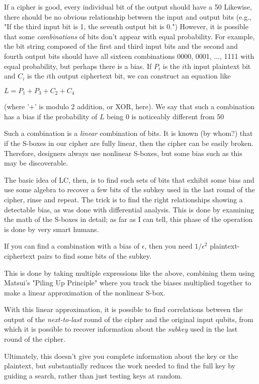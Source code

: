 \documentclass[%
 aip,
 jmp,%
 amsmath,amssymb,
 reprint,%
]{revtex4-1}
\begin{document}
If a cipher is good, every individual bit of the output should have a
50%
Likewise, there should be no obvious relationship between the input
and output bits (e.g., "If the third input bit is 1, the seventh
output bit is 0.")  However, it is possible that some \emph{combinations}
of bits don't appear with equal probability. For example, the bit
string composed of the first and third input bits and the second and
fourth output bits should have all sixteen combinations 0000, 0001,
..., 1111 with equal probability, but perhaps there is a bias.  If $P_i$
is the $i$th input plaintext bit and $C_i$ is the $i$th output ciphertext
bit, we can construct an equation like

$L = P_1 + P_3 + C_2 + C_4$

(where '+' is modulo 2 addition, or XOR, here).  We say that such a
combination has a bias if the probability of $L$ being 0 is noticeably
different from 50%

Such a combination is a \emph{linear} combination of bits.  It is known (by
whom?) that if the S-boxes in our cipher are fully linear, then the
cipher can be easily broken.  Therefore, designers always use
nonlinear S-boxes, but some bias such as this may be discoverable.

The basic idea of LC, then, is to find such sets of bits that exhibit
some bias and use some algebra to recover a few bits of the subkey
used in the last round of the cipher, rinse and repeat.  The trick is
to find the right relationships showing a detectable bias, as was done
with differential analysis.  This is done by examining the math of the
S-boxes in detail; as far as I can tell, this phase of the operation
is done by very smart humans.

If you can find a combination with a bias of $\epsilon$, then you need
$1/\epsilon^2$ plaintext-ciphertext pairs to find some bits of the
subkey.

This is done by taking multiple expressions like the above, combining
them using Matsui's "Piling Up Principle" where you track the biases
multiplied together to make a linear approximation of the nonlinear
S-box.

With this linear approximation, it is possible to find correlations
between the output of the \emph{next-to-last} round of the cipher and the
original input qubits, from which it is possible to recover
information about the \emph{subkey} used in the last round of the cipher.

Ultimately, this doesn't give you complete information about the key
or the plaintext, but substantially reduces the work needed to find
the full key by guiding a search, rather than just testing keys at
random.
\end{document}
